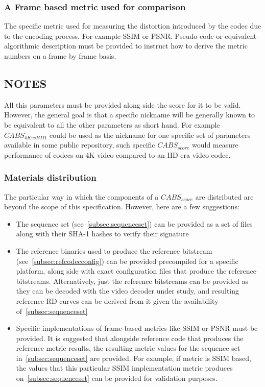 \documentclass[12pt, conference, hidelinks, onecolumn]{IEEEtran}
\begin{document}
\subsubsection{A Frame based metric used for comparison}
\label{subsec:framebasemetric}
The specific metric used for measuring the distortion introduced by the codec due to the encoding process. For example SSIM or PSNR. Pseudo-code or equivalent algorithmic description must be provided to instruct how to derive the metric numbers on a frame by frame basis.

\subsection{NOTES}
All this parameters must be provided along side the score for it to be valid. However, the general goal is that a specific nickname will be generally known to be equivalent to all the other parameters as short hand. For example $CABS_{4KvsHD1}$ could be used as the nickname for one specific set of parameters available in some public repository, such specific $CABS_{score}$ would measure performance of codecs on 4K video compared to an HD era video codec.

\subsubsection{Materials distribution}
The particular way in which the components of a $CABS_{score}$ are distributed are beyond the scope of this specification. However, here are a few suggestions:

\begin{itemize}
  \item The sequence set (see~\ref{subsec:sequenceset}) can be provided as a set of files along with their SHA-1 hashes\cite{shs} to verify their signature
  \item The reference binaries used to produce the reference bitstream (see~\ref{subsec:refcodecconfig}) can be provided precompiled for a specific platform, along side with exact configuration files that produce the reference bitstreams. Alternatively, just the reference bitstreams can be provided as they can be decoded with the video decoder under study, and resulting reference RD curves can be derived from it given the availability of~\ref{subsec:sequenceset}
  \item Specific implementations of frame-based metrics like SSIM or PSNR must be provided. It is suggested that alongside reference code that produces the reference metric results, the resulting metric values for the sequence set in~\ref{subsec:sequenceset} are provided. For example, if metric is SSIM based, the values that this particular SSIM implementation metric produces on~\ref{subsec:sequenceset} can be provided for validation purposes.
\end{itemize}
\end{document}
